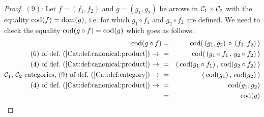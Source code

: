 \begin{proof}
    $(9)$: Let $f=(f_{1},f_{2})$ and $g=(g_{1},g_{2})$ be arrows in $\mbox{${\cal C}_{1}$}\times
    \mbox{${\cal C}_{2}$}$ with the equality $\mbox{\rm cod}(f)=\mbox{\rm dom}(g)$, i.e. for which $g_{1}\circ f_{1}$
    and $g_{2}\circ f_{2}$ are defined. We need to check the equality
    $\mbox{\rm cod}(g\circ f) = \mbox{\rm cod}(g)$ which goes as follows:
        \begin{eqnarray*}\cod(g\circ f)
            &=&\cod(\,(g_{1},g_{2})\,\circ\,(f_{1},f_{2})\,)\\
            \mbox{$(6)$ of def.~(\ref{Cat:def:canonical:product})\ $\to$\ }
            &=&\cod(\,(g_{1}\circ f_{1}\,,\,g_{2}\circ f_{2})\,)\\
            \mbox{$(4)$ of def.~(\ref{Cat:def:canonical:product})\ $\to$\ }
            &=&(\,\cod(g_{1}\circ f_{1})\,,\,\cod(g_{2}\circ f_{2})\,)\\
            \mbox{\Cone,\ \Ctwo\ categories, 
                $(9)$ of def.~(\ref{Cat:def:category})\ $\to$\ }
            &=&(\,\cod(g_{1})\,,\,\cod(g_{2})\,)\\
            \mbox{$(4)$ of def.~(\ref{Cat:def:canonical:product})\ $\to$\ }
            &=&\cod(g_{1},g_{2})\\
            &=&\cod(g)
        \end{eqnarray*}


\end{proof}
